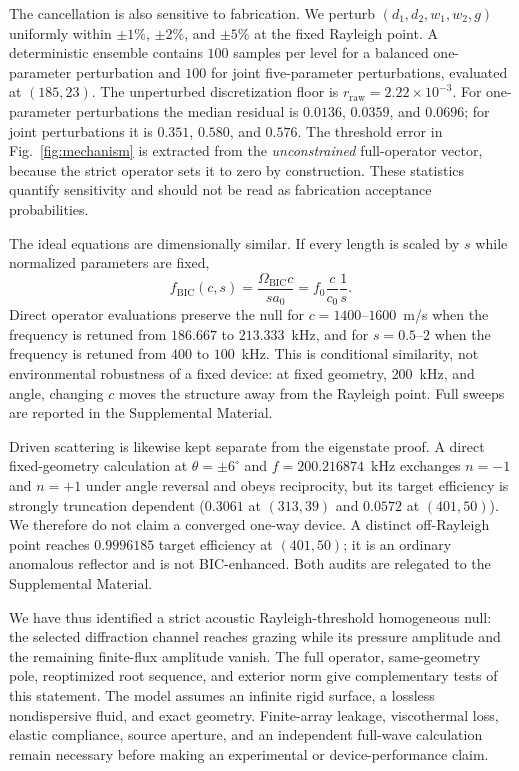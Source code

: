 \documentclass[aps,prl,reprint,superscriptaddress,nofootinbib]{revtex4-2}
\newcommand{\BIC}{\mathrm{BIC}}
\begin{document}
The cancellation is also sensitive to fabrication.  We perturb
$(d_1,d_2,w_1,w_2,g)$ uniformly within $\pm1\%$, $\pm2\%$, and $\pm5\%$ at
the fixed Rayleigh point.  A deterministic ensemble contains $100$ samples
per level for a balanced one-parameter perturbation and $100$ for joint
five-parameter perturbations, evaluated at $(185,23)$.  The unperturbed
discretization floor is $r_{\mathrm{raw}}=2.22\times10^{-3}$.  For
one-parameter perturbations the median residual is $0.0136$, $0.0359$, and
$0.0696$; for joint perturbations it is $0.351$, $0.580$, and $0.576$.
The threshold error in Fig.~\ref{fig:mechanism} is extracted from the
\emph{unconstrained} full-operator vector, because the strict operator sets it
to zero by construction.  These statistics quantify sensitivity and should
not be read as fabrication acceptance probabilities.

The ideal equations are dimensionally similar.  If every length is scaled by
$s$ while normalized parameters are fixed,
\begin{equation}
 f_{\BIC}(c,s)=\frac{\Omega_{\BIC}c}{s a_0}
 =f_0\frac{c}{c_0}\frac{1}{s}.                                         \label{eq:scaling}
\end{equation}
Direct operator evaluations preserve the null for $c=1400$--$1600$~m/s when
the frequency is retuned from $186.667$ to $213.333$~kHz, and for
$s=0.5$--$2$ when the frequency is retuned from $400$ to $100$~kHz.  This is
conditional similarity, not environmental robustness of a fixed device: at
fixed geometry, $200$~kHz, and angle, changing $c$ moves the structure away
from the Rayleigh point.  Full sweeps are reported in the Supplemental
Material.

Driven scattering is likewise kept separate from the eigenstate proof.  A
direct fixed-geometry calculation at $\theta=\pm6^{\circ}$ and
$f=200.216874$~kHz exchanges $n=-1$ and $n=+1$ under angle reversal and obeys
reciprocity, but its target efficiency is strongly truncation dependent
($0.3061$ at $(313,39)$ and $0.0572$ at $(401,50)$).  We therefore do not
claim a converged one-way device.  A distinct off-Rayleigh point reaches
$0.9996185$ target efficiency at $(401,50)$; it is an ordinary anomalous
reflector and is not BIC-enhanced.  Both audits are relegated to the
Supplemental Material.

We have thus identified a strict acoustic Rayleigh-threshold homogeneous null:
the selected diffraction channel reaches grazing while its pressure
amplitude and the remaining finite-flux amplitude vanish.  The full operator,
same-geometry pole, reoptimized root sequence, and exterior norm give
complementary tests of this statement.  The model assumes an infinite rigid
surface, a lossless nondispersive fluid, and exact geometry.  Finite-array
leakage, viscothermal loss, elastic compliance, source aperture, and an
independent full-wave calculation remain necessary before making an
experimental or device-performance claim.


\end{document}
